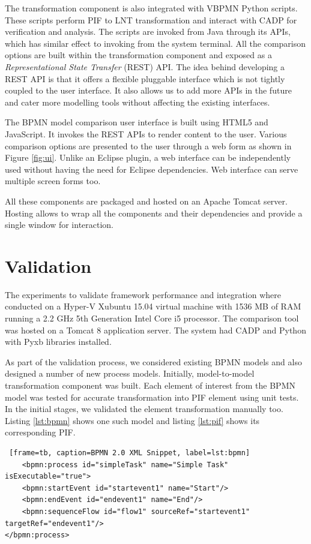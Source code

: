 \documentclass{article}
\begin{document}
The transformation component is also integrated with VBPMN Python scripts. These scripts perform PIF to LNT transformation and interact with CADP for verification and analysis. The scripts are invoked from Java through its APIs, which has similar effect to invoking from the system terminal. All the comparison options are built within the transformation component and exposed as a \textit{Representational State Transfer} (REST) API. The idea behind developing a REST API is that it offers a flexible pluggable interface which is not tightly coupled to the user interface. It also allows us to add more APIs in the future and cater more modelling tools without affecting the existing interfaces.
 
The BPMN model comparison user interface is built using HTML5 and JavaScript. It invokes the REST APIs to render content to the user. Various comparison options are presented to the user through a web form as shown in Figure \ref{fig:ui}. Unlike an Eclipse plugin, a web interface can be independently used without having the need for Eclipse dependencies. Web interface can serve multiple screen forms too. 

All these components are packaged and hosted on an Apache Tomcat server. Hosting allows to wrap all the components  and their dependencies and provide a single window for interaction.

\section{Validation}
The experiments to validate framework performance and integration where conducted on a Hyper-V Xubuntu 15.04 virtual machine with 1536 MB of RAM running a 2.2 GHz 5th Generation Intel Core i5 processor.  The comparison tool was hosted on a Tomcat 8 application server. The system had CADP and Python with Pyxb libraries installed.

As part of the validation process, we considered existing BPMN models and also designed a number of new process models. Initially, model-to-model transformation component was built. Each element of interest from the BPMN model was tested for accurate transformation into PIF element using unit tests. In the initial stages, we validated the element transformation manually too. Listing \ref{lst:bpmn} shows one such model and listing \ref{lst:pif} shows its corresponding PIF.

\lstset{language=XML, breaklines=true, showstringspaces=false, columns=flexible}
\begin{lstlisting} [frame=tb, caption=BPMN 2.0 XML Snippet, label=lst:bpmn]
	<bpmn:process id="simpleTask" name="Simple Task" isExecutable="true">
	<bpmn:startEvent id="startevent1" name="Start"/>
	<bpmn:endEvent id="endevent1" name="End"/>
	<bpmn:sequenceFlow id="flow1" sourceRef="startevent1" targetRef="endevent1"/>
</bpmn:process>
\end{lstlisting}
\end{document}
